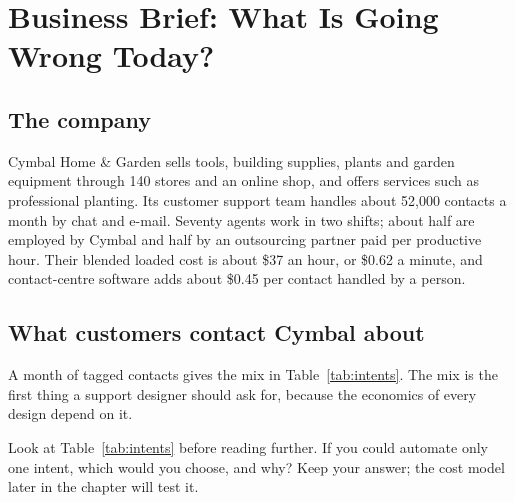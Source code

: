 \section{Business Brief: What Is Going Wrong Today?}
\label{sec:support-brief}

\subsection{The company}

Cymbal Home \& Garden sells tools, building supplies, plants and garden equipment through 140 stores and an online shop, and offers services such as professional planting. Its customer support team handles about 52{,}000 contacts a month by chat and e-mail. Seventy agents work in two shifts; about half are employed by Cymbal and half by an outsourcing partner paid per productive hour. Their blended loaded cost is about \$37 an hour, or \$0.62 a minute, and contact-centre software adds about \$0.45 per contact handled by a person.

\subsection{What customers contact Cymbal about}

A month of tagged contacts gives the mix in Table~\ref{tab:intents}. The mix is the first thing a support designer should ask for, because the economics of every design depend on it.

\begin{thinkabout}
Look at Table~\ref{tab:intents} before reading further. If you could automate only one intent, which would you choose, and why? Keep your answer; the cost model later in the chapter will test it.
\end{thinkabout}

